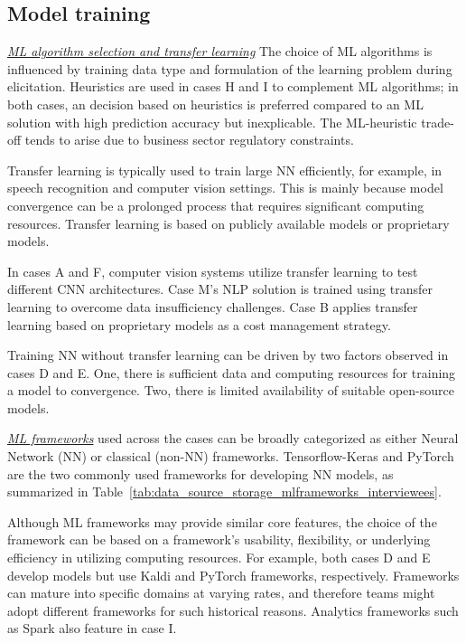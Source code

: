 \subsection{Model training}

\underline{\emph{ML algorithm selection and transfer learning}}
The choice of ML algorithms is influenced by training data type and formulation of the learning problem during \DIFdelbegin {}\DIFdelend \DIFaddbegin {}\DIFaddend elicitation. Heuristics are used in cases H and I to complement ML algorithms; in both cases, an \DIFdelbegin {}\DIFdelend \DIFaddbegin {}\DIFaddend decision based on heuristics is preferred compared to an ML solution with high prediction accuracy but inexplicable. The ML-heuristic trade-off tends to arise due to business sector regulatory constraints.

Transfer learning is typically used to train large NN efficiently, for example, in speech recognition and computer vision settings. This is mainly because model convergence can be a prolonged process that requires significant computing resources. Transfer learning is based on publicly available models or proprietary models.

In cases A and F, computer vision systems utilize transfer learning to test different CNN architectures. Case M's NLP solution is trained using transfer learning to overcome data insufficiency challenges. Case B applies transfer learning based on proprietary models as a cost management strategy. 

Training NN without transfer learning can be driven by two factors observed in cases D and E. One, there is sufficient data and computing resources for training a model to convergence. Two, there is limited availability of suitable open-source models.

\underline{\emph{ML frameworks}}
used across the cases can be broadly categorized as either Neural Network (NN) or classical (non-NN) frameworks. Tensorflow-Keras and PyTorch are the two commonly used frameworks for developing NN models, as summarized in  Table~\ref{tab:data_source_storage_mlframeworks_interviewees}.

Although ML frameworks may provide similar core features, the choice of the framework can be based on a framework's usability, flexibility, or underlying efficiency in utilizing computing resources. For example, both cases D and E develop \DIFdelbegin {}\DIFdelend \DIFaddbegin {}\DIFaddend models but use Kaldi and PyTorch frameworks, respectively. 
Frameworks can mature into specific domains at varying rates, and therefore teams might adopt different frameworks for such historical reasons. Analytics frameworks such as Spark also feature in case I. 

